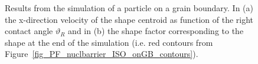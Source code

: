 \begin{figure}
	\centering
	\caption{Results from the simulation of a particle on a grain boundary. In (a) the x-direction velocity of the shape centroid as function of the right contact angle $\vartheta_R$ and in (b) the shape factor corresponding to the shape at the end of the simulation (i.e. red contours from Figure~\ref{fig_PF_nuclbarrier_ISO_onGB_contours}).}
	\label{fig_PF_nuclbarrier_ISO_onGB_results}
\end{figure}

 

\cleardoublepage

